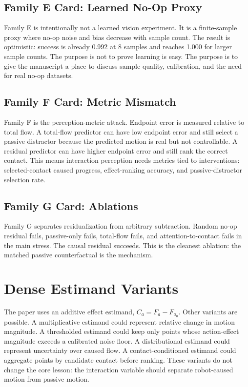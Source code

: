 \documentclass{article}
\newcommand{\noop}{a_0}
\begin{document}
\subsection{Family E Card: Learned No-Op Proxy}

Family E is intentionally not a learned vision experiment.  It is a finite-sample proxy
where no-op noise and bias decrease with sample count.  The result is optimistic:
success is already 0.992 at 8 samples and reaches 1.000 for larger sample counts.  The
purpose is not to prove learning is easy.  The purpose is to give the manuscript a place
to discuss sample quality, calibration, and the need for real no-op datasets.

\subsection{Family F Card: Metric Mismatch}

Family F is the perception-metric attack.  Endpoint error is measured relative to total
flow.  A total-flow predictor can have low endpoint error and still select a passive
distractor because the predicted motion is real but not controllable.  A residual
predictor can have higher endpoint error and still rank the correct contact.  This means
interaction perception needs metrics tied to interventions: selected-contact caused
progress, effect-ranking accuracy, and passive-distractor selection rate.

\subsection{Family G Card: Ablations}

Family G separates residualization from arbitrary subtraction.  Random no-op residual
fails, passive-only fails, total-flow fails, and attention-to-contact fails in the main
stress.  The causal residual succeeds.  This is the cleanest ablation: the matched
passive counterfactual is the mechanism.

\section{Dense Estimand Variants}

The paper uses an additive effect estimand, $C_a=F_a-F_{\noop}$.  Other variants are
possible.  A multiplicative estimand could represent relative change in motion magnitude.
A thresholded estimand could keep only points whose action-effect magnitude exceeds a
calibrated noise floor.  A distributional estimand could represent uncertainty over
caused flow.  A contact-conditioned estimand could aggregate points by candidate contact
before ranking.  These variants do not change the core lesson: the interaction variable
should separate robot-caused motion from passive motion.
\end{document}
